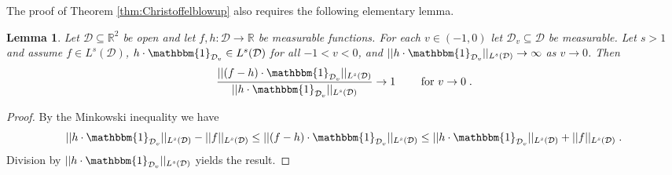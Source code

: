 \documentclass{article}
\newcommand{\Q}{\mathcal{Q}}
\newcommand{\R}{\mathbb{R}}
\newtheorem{lemma}[definition]{Lemma}
\begin{document}
The proof of Theorem \ref{thm:Christoffelblowup} also requires the following elementary lemma.

\begin{lemma}\label{lemma:integralbalance}
    Let $\mathcal{D} \subseteq \R^2$ be open and let $f,h : \mathcal{D} \to \R$ be measurable functions. For each $v \in (-1,0)$ let $\mathcal{D}_v \subseteq \mathcal{D}$ be measurable. Let ${s}>1$ and assume $f \in L^{s}(\mathcal{D})$, $h \cdot \mathbbm{1}_{\mathcal{D}_v} \in L^{s}(\mathcal{D})$ for all $-1<v <0$, and $||h \cdot \mathbbm{1}_{\mathcal{D}_v}||_{L^{s}(\mathcal{D})} \to \infty$ as $v \to 0$. Then
    \begin{equation*}
        \frac{|| (f-h)\cdot \mathbbm{1}_{\mathcal{D}_v}||_{L^{s}(\mathcal{D})}}{||h \cdot \mathbbm{1}_{\mathcal{D}_v}||_{L^{s}(\mathcal{D})}} \to 1 \qquad \textnormal{ for } v \to 0 \;.
    \end{equation*}
\end{lemma}

\begin{proof}
    By the Minkowski inequality we have
    \begin{equation*}
        ||h \cdot \mathbbm{1}_{\mathcal{D}_v}||_{L^{s}(\mathcal{D})} - ||f||_{L^{s}(\mathcal{D})} \leq || (f-h)\cdot \mathbbm{1}_{\mathcal{D}_v}||_{L^{s}(\mathcal{D})} \leq ||h \cdot \mathbbm{1}_{\mathcal{D}_v}||_{L^{s}(\mathcal{D})} + ||f||_{L^{s}(\mathcal{D})} \;.
    \end{equation*}
    Division by $||h \cdot \mathbbm{1}_{\mathcal{D}_v}||_{L^{s}(\mathcal{D})}$ yields the result.
\end{proof}

\end{document}
